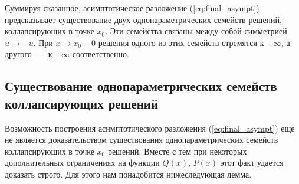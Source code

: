 Суммируя сказанное, асимптотическое разложение (\ref{eq:final_asympt}) предсказывает существование двух однопараметрических семейств решений, коллапсирующих в точке $x_0$.
Эти семейства связаны между собой симметрией $u \to -u$.
При $x \to x_0 - 0$ решения одного из этих семейств стремятся к $+\infty$, а другого~---~к $-\infty$ соответственно.

\subsection{Существование однопараметрических семейств коллапсирующих решений}

Возможность построения асимптотического разложения (\ref{eq:final_asympt}) еще не является доказательством существования однопараметрических семейств коллапсирующих в точке $x_0$ решений.
Вместе с тем при некоторых дополнительных ограничениях на функции $Q(x)$, $P(x)$ этот факт удается доказать строго.
Для этого нам понадобится нижеследующая лемма.

